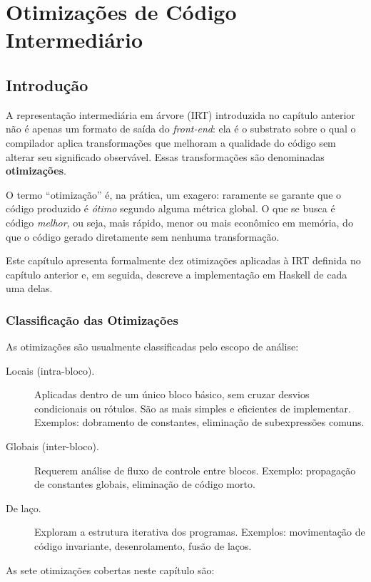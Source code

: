 \chapter{Otimizações de Código Intermediário}

\section{Introdução}

A representação intermediária em árvore (IRT) introduzida no capítulo anterior
não é apenas um formato de saída do \emph{front-end}: ela é o substrato sobre o
qual o compilador aplica transformações que melhoram a qualidade do código sem
alterar seu significado observável.  Essas transformações são denominadas
\textbf{otimizações}.

O termo ``otimização'' é, na prática, um exagero: raramente se garante que o
código produzido é \emph{ótimo} segundo alguma métrica global.  O que se busca
é código \emph{melhor}, ou seja, mais rápido, menor ou mais econômico
em memória,
do que o código gerado diretamente sem nenhuma transformação.

Este capítulo apresenta formalmente dez otimizações aplicadas à IRT
definida no capítulo anterior e, em seguida, descreve a implementação em Haskell
de cada uma delas.

\subsection*{Classificação das Otimizações}

As otimizações são usualmente classificadas pelo escopo de análise:

\begin{description}
  \item[Locais (intra-bloco).] Aplicadas dentro de um único bloco básico, sem
    cruzar desvios condicionais ou rótulos.  São as mais simples e eficientes de
    implementar.  Exemplos: dobramento de constantes, eliminação de
    subexpressões comuns.
  \item[Globais (inter-bloco).] Requerem análise de fluxo de controle entre
    blocos.  Exemplo: propagação de constantes globais, eliminação de código
    morto.
  \item[De laço.] Exploram a estrutura iterativa dos programas.  Exemplos:
    movimentação de código invariante, desenrolamento, fusão de laços.
\end{description}

As sete otimizações cobertas neste capítulo são:

